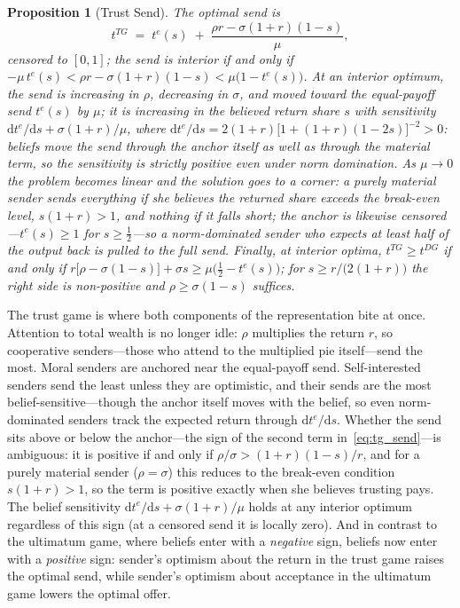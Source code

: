 \documentclass[11pt]{article}
\theoremstyle{plain}
\newtheorem{proposition}{Proposition}
\theoremstyle{remark}
\begin{document}
\begin{proposition}[Trust Send]
\label{prop:tg}
The optimal send is
\begin{equation}
t^{TG}\;=\;t^{e}(s)\;+\;\frac{\rho r-\sigma(1+r)(1-s)}{\mu},
\label{eq:tg_send}
\end{equation}
censored to $[0,1]$; the send is interior if and only if $-\mu\,t^{e}(s)<\rho r-\sigma(1+r)(1-s)<\mu\bigl(1-t^{e}(s)\bigr)$. At an interior optimum, the send is increasing in $\rho$, decreasing in $\sigma$, and moved toward the equal-payoff send $t^{e}(s)$ by $\mu$; it is increasing in the believed return share $s$ with sensitivity $\mathrm{d}t^{e}/\mathrm{d}s+\sigma(1+r)/\mu$, where $\mathrm{d}t^{e}/\mathrm{d}s=2(1+r)\bigl[1+(1+r)(1-2s)\bigr]^{-2}>0$: beliefs move the send through the anchor itself as well as through the material term, so the sensitivity is strictly positive even under norm domination. As $\mu\to 0$ the problem becomes linear and the solution goes to a corner: a purely material sender sends everything if she believes the returned share exceeds the break-even level, $s(1+r)>1$, and nothing if it falls short; the anchor is likewise censored---$t^{e}(s)\ge1$ for $s\ge\tfrac12$---so a norm-dominated sender who expects at least half of the output back is pulled to the full send. Finally, at interior optima, $t^{TG}\ge t^{DG}$ if and only if $r\bigl[\rho-\sigma(1-s)\bigr]+\sigma s\ge\mu\bigl(\tfrac12-t^{e}(s)\bigr)$; for $s\ge r/\bigl(2(1+r)\bigr)$ the right side is non-positive and $\rho\ge\sigma(1-s)$ suffices.
\end{proposition}

The trust game is where both components of the representation bite at once. Attention to total wealth is no longer idle: $\rho$ multiplies the return $r$, so cooperative senders---those who attend to the multiplied pie itself---send the most. Moral senders are anchored near the equal-payoff send. Self-interested senders send the least unless they are optimistic, and their sends are the most belief-sensitive---though the anchor itself moves with the belief, so even norm-dominated senders track the expected return through $\mathrm{d}t^{e}/\mathrm{d}s$. Whether the send sits above or below the anchor---the sign of the second term in~\eqref{eq:tg_send}---is ambiguous: it is positive if and only if $\rho/\sigma>(1+r)(1-s)/r$, and for a purely material sender ($\rho=\sigma$) this reduces to the break-even condition $s(1+r)>1$, so the term is positive exactly when she believes trusting pays. The belief sensitivity $\mathrm{d}t^{e}/\mathrm{d}s+\sigma(1+r)/\mu$ holds at any interior optimum regardless of this sign (at a censored send it is locally zero). And in contrast to the ultimatum game, where beliefs enter with a \emph{negative} sign, beliefs now enter with a \emph{positive} sign: sender's optimism about the return in the trust game raises the optimal send, while sender's optimism about acceptance in the ultimatum game lowers the optimal offer. 
\end{document}
